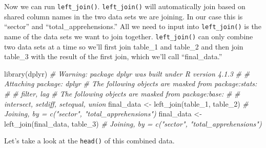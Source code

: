 \documentclass[
  a4paper,
]{krantz}
\makeatletter
\newenvironment{Shaded}{\begin{snugshade}}{\end{snugshade}}
\newcommand{\CommentTok}[1]{\textcolor[rgb]{0.56,0.35,0.01}{\textit{#1}}}
\newcommand{\FunctionTok}[1]{\textcolor[rgb]{0.00,0.00,0.00}{#1}}
\newcommand{\NormalTok}[1]{#1}
\newcommand{\OtherTok}[1]{\textcolor[rgb]{0.56,0.35,0.01}{#1}}
\newcommand{\SpecialCharTok}[1]{\textcolor[rgb]{0.00,0.00,0.00}{#1}}
\newcommand{\StringTok}[1]{\textcolor[rgb]{0.31,0.60,0.02}{#1}}
\newenvironment{kframe}{%
\medskip{}
\setlength{\fboxsep}{.8em}
 \def\at@end@of@kframe{}%
 \ifinner\ifhmode%
  \def\at@end@of@kframe{\end{minipage}}%
  \begin{minipage}{\columnwidth}%
 \fi\fi%
 \def\FrameCommand##1{\hskip\@totalleftmargin \hskip-\fboxsep
 \colorbox{shadecolor}{##1}\hskip-\fboxsep
     \hskip-\linewidth \hskip-\@totalleftmargin \hskip\columnwidth}%
 \MakeFramed {\advance\hsize-\width
   \@totalleftmargin\z@ \linewidth\hsize
   \@setminipage}}%
 {\par\unskip\endMakeFramed%
 \at@end@of@kframe}
\renewenvironment{Shaded}{\begin{kframe}}{\end{kframe}}
\makeatother
\begin{document}
\begin{Shaded}
\end{Shaded}

Now we can run \texttt{left\_join()}. \texttt{left\_join()}
will automatically join based on shared column names in the
two data sets we are joining. In our case this is ``sector''
and ``total\_apprehensions.'' All we need to input into
\texttt{left\_join()} is the name of the data sets we want
to join together. \texttt{left\_join()} can only combine two
data sets at a time so we'll first join table\_1 and
table\_2 and then join table\_3 with the result of the first
join, which we'll call ``final\_data.''

\begin{Shaded}
\begin{Highlighting}[]
\FunctionTok{library}\NormalTok{(dplyr)}
\CommentTok{\# Warning: package \textquotesingle{}dplyr\textquotesingle{} was built under R version 4.1.3}
\CommentTok{\# }
\CommentTok{\# Attaching package: \textquotesingle{}dplyr\textquotesingle{}}
\CommentTok{\# The following objects are masked from \textquotesingle{}package:stats\textquotesingle{}:}
\CommentTok{\# }
\CommentTok{\#     filter, lag}
\CommentTok{\# The following objects are masked from \textquotesingle{}package:base\textquotesingle{}:}
\CommentTok{\# }
\CommentTok{\#     intersect, setdiff, setequal, union}
\NormalTok{final\_data }\OtherTok{\textless{}{-}} \FunctionTok{left\_join}\NormalTok{(table\_1, table\_2)}
\CommentTok{\# Joining, by = c("sector", "total\_apprehensions")}
\NormalTok{final\_data }\OtherTok{\textless{}{-}} \FunctionTok{left\_join}\NormalTok{(final\_data, table\_3)}
\CommentTok{\# Joining, by = c("sector", "total\_apprehensions")}
\end{Highlighting}
\end{Shaded}

Let's take a look at the \texttt{head()} of this combined
data.
\end{document}
